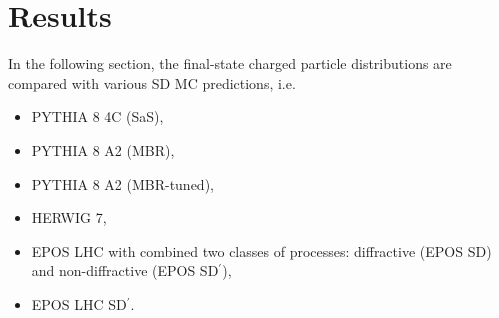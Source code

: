 \chapter{Results}\label{section:star_results}
In the following section, the  final-state charged particle distributions are compared with various  SD MC predictions, i.e. 
\begin{itemize}
	\item PYTHIA 8 4C (SaS),
	\item PYTHIA 8 A2 (MBR),
	\item PYTHIA 8 A2 (MBR-tuned),
	\item HERWIG 7,
	\item EPOS LHC with combined two classes of processes: diffractive (EPOS SD) and non-diffractive (EPOS SD$^\prime$),
	\item EPOS LHC SD$^\prime$.
\end{itemize}

